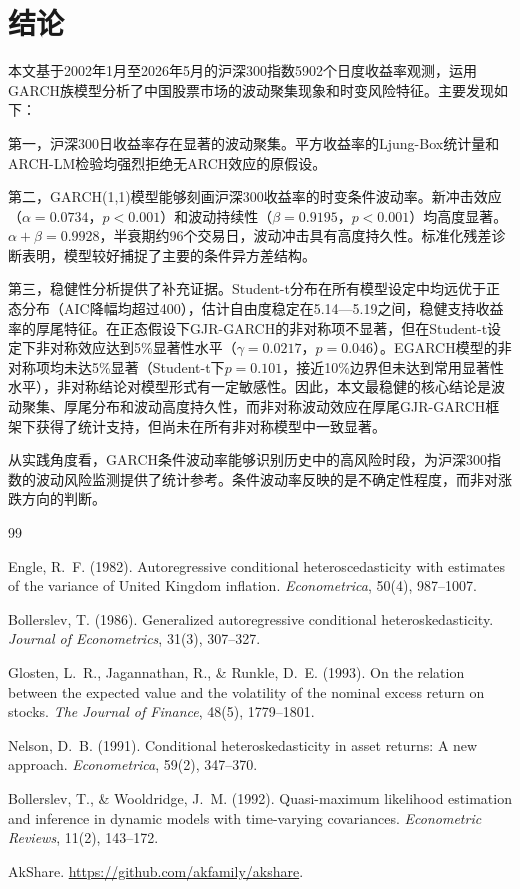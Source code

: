 \documentclass[11pt,a4paper]{article}
\begin{document}
\section{结论}

本文基于2002年1月至2026年5月的沪深300指数5902个日度收益率观测，运用GARCH族模型分析了中国股票市场的波动聚集现象和时变风险特征。主要发现如下：

第一，沪深300日收益率存在显著的波动聚集。平方收益率的Ljung-Box统计量和ARCH-LM检验均强烈拒绝无ARCH效应的原假设。

第二，GARCH(1,1)模型能够刻画沪深300收益率的时变条件波动率。新冲击效应（\(\alpha=0.0734\)，\(p<0.001\)）和波动持续性（\(\beta=0.9195\)，\(p<0.001\)）均高度显著。\(\alpha+\beta=0.9928\)，半衰期约96个交易日，波动冲击具有高度持久性。标准化残差诊断表明，模型较好捕捉了主要的条件异方差结构。

第三，稳健性分析提供了补充证据。Student-t分布在所有模型设定中均远优于正态分布（AIC降幅均超过400），估计自由度稳定在5.14—5.19之间，稳健支持收益率的厚尾特征。在正态假设下GJR-GARCH的非对称项不显著，但在Student-t设定下非对称效应达到5\%显著性水平（\(\gamma=0.0217\)，\(p=0.046\)）。EGARCH模型的非对称项均未达5\%显著（Student-t下\(p=0.101\)，接近10\%边界但未达到常用显著性水平），非对称结论对模型形式有一定敏感性。因此，本文最稳健的核心结论是波动聚集、厚尾分布和波动高度持久性，而非对称波动效应在厚尾GJR-GARCH框架下获得了统计支持，但尚未在所有非对称模型中一致显著。

从实践角度看，GARCH条件波动率能够识别历史中的高风险时段，为沪深300指数的波动风险监测提供了统计参考。条件波动率反映的是不确定性程度，而非对涨跌方向的判断。

\begin{thebibliography}{99}

Engle, R.~F. (1982).
Autoregressive conditional heteroscedasticity with estimates of the variance of United Kingdom inflation.
\textit{Econometrica}, 50(4), 987--1007.

Bollerslev, T. (1986).
Generalized autoregressive conditional heteroskedasticity.
\textit{Journal of Econometrics}, 31(3), 307--327.

Glosten, L.~R., Jagannathan, R., \& Runkle, D.~E. (1993).
On the relation between the expected value and the volatility of the nominal excess return on stocks.
\textit{The Journal of Finance}, 48(5), 1779--1801.

Nelson, D.~B. (1991).
Conditional heteroskedasticity in asset returns: A new approach.
\textit{Econometrica}, 59(2), 347--370.

Bollerslev, T., \& Wooldridge, J.~M. (1992).
Quasi-maximum likelihood estimation and inference in dynamic models with time-varying covariances.
\textit{Econometric Reviews}, 11(2), 143--172.

AkShare. \url{https://github.com/akfamily/akshare}.

\end{thebibliography}
\end{document}
